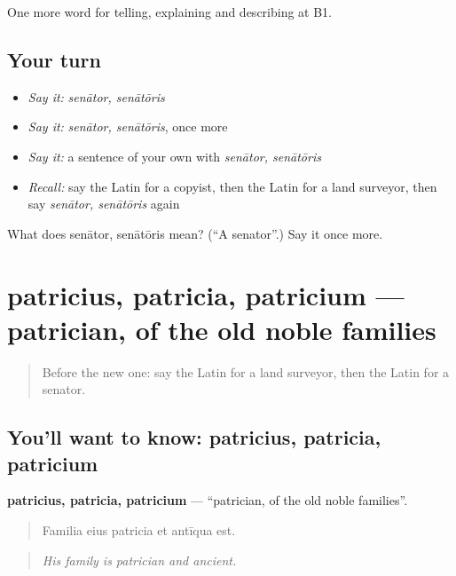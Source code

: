\begin{grammarlens}[title={What you've built}]
One more word for telling, explaining and describing at B1.
\end{grammarlens}

\subsection*{Your turn}
\begin{itemize}
\raggedright
  \item \emph{Say it:} \emph{senātor, senātōris}
  \item \emph{Say it:} \emph{senātor, senātōris}, once more
  \item \emph{Say it:} a sentence of your own with \emph{senātor, senātōris}
  \item \emph{Recall:} say the Latin for a copyist, then the Latin for a land surveyor, then say \emph{senātor, senātōris} again
\end{itemize}

\begin{tcolorbox}[breakable,colback=teal!4,colframe=teal!35!black,title={Before you move on}]
What does senātor, senātōris mean? (\textquotedblleft{}A senator\textquotedblright{}.) Say it once more.
\end{tcolorbox}
\section[patricius, patricia, patricium]{patricius, patricia, patricium — patrician, of the old noble families}

\label{lesson:LA-C382-patricius}



\begin{quote}
Before the new one: say the Latin for a land surveyor, then the Latin for a senator.
\end{quote}

\subsection*{You'll want to know: patricius, patricia, patricium}
\textbf{patricius, patricia, patricium} — \textquotedblleft{}patrician, of the old noble families\textquotedblright{}.

\begin{quote}
Familia eius patricia et antīqua est.
\end{quote}

\begin{quote}
\emph{His family is patrician and ancient.}
\end{quote}

